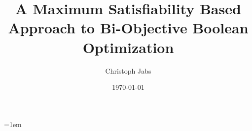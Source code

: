 \documentclass[english,twoside,censored,csm,algorithms-track-2020]{HYthesisML}
\title{A Maximum Satisfiability Based Approach to Bi-Objective Boolean Optimization}
\author{Christoph Jabs}
\date{\today}
\begin{document}
\maketitle






\mytableofcontents

\mainmatter









{}  %
\emergencystretch=1em
\printbibliography

\backmatter
\begin{appendices}



\end{appendices}
\end{document}
